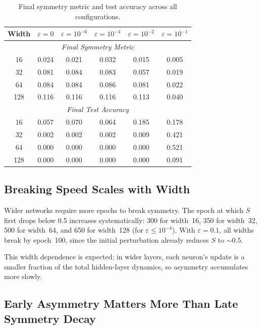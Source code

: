 \documentclass[11pt,a4paper]{article}
\begin{document}
\begin{table}[h]
\centering
\small
\caption{Final symmetry metric and test accuracy across all configurations.}
\label{tab:results}
\begin{tabular}{cccccc}
\toprule
\textbf{Width} & $\varepsilon = 0$ & $\varepsilon = 10^{-6}$ & $\varepsilon = 10^{-4}$ & $\varepsilon = 10^{-2}$ & $\varepsilon = 10^{-1}$ \\
\midrule
\multicolumn{6}{c}{\emph{Final Symmetry Metric}} \\
\midrule
16  & 0.024 & 0.021 & 0.032 & 0.015 & 0.005 \\
32  & 0.081 & 0.084 & 0.083 & 0.057 & 0.019 \\
64  & 0.084 & 0.084 & 0.086 & 0.081 & 0.022 \\
128 & 0.116 & 0.116 & 0.116 & 0.113 & 0.040 \\
\midrule
\multicolumn{6}{c}{\emph{Final Test Accuracy}} \\
\midrule
16  & 0.057 & 0.070 & 0.064 & 0.185 & 0.178 \\
32  & 0.002 & 0.002 & 0.002 & 0.009 & 0.421 \\
64  & 0.000 & 0.000 & 0.000 & 0.000 & 0.521 \\
128 & 0.000 & 0.000 & 0.000 & 0.000 & 0.091 \\
\bottomrule
\end{tabular}
\end{table}

\subsection{Breaking Speed Scales with Width}

Wider networks require more epochs to break symmetry.
The epoch at which $S$ first drops below 0.5 increases systematically: 300 for width~16, 350 for width~32, 500 for width~64, and 650 for width~128 (for $\varepsilon \leq 10^{-4}$).
With $\varepsilon = 0.1$, all widths break by epoch~100, since the initial perturbation already reduces $S$ to $\sim 0.5$.

This width dependence is expected: in wider layers, each neuron's update is a smaller fraction of the total hidden-layer dynamics, so asymmetry accumulates more slowly.

\subsection{Early Asymmetry Matters More Than Late Symmetry Decay}
\end{document}

